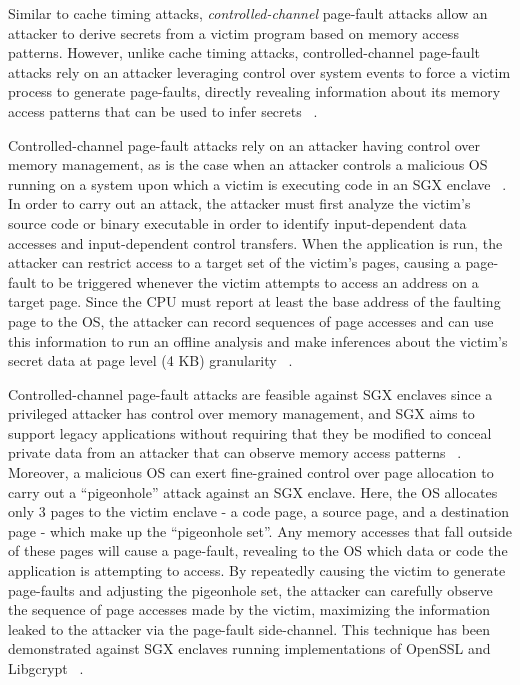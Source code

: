 Similar to cache timing attacks, \emph{controlled-channel} page-fault attacks allow an attacker to derive secrets from a victim program based on memory access patterns. However, unlike cache timing attacks, controlled-channel page-fault attacks rely on an attacker leveraging control over system events to force a victim process to generate page-faults, directly revealing information about its memory access patterns that can be used to infer secrets ~\cite{xu_controlled-channel_2015}.

Controlled-channel page-fault attacks rely on an attacker having control over memory management, as is the case when an attacker controls a malicious OS running on a system upon which a victim is executing code in an SGX enclave ~\cite{intel_corporation_tutorial_2015}. In order to carry out an attack, the attacker must first analyze the victim's source code or binary executable in order to identify input-dependent data accesses and input-dependent control transfers. When the application is run, the attacker can restrict access to a target set of the victim's pages, causing a page-fault to be triggered whenever the victim attempts to access an address on a target page. Since the CPU must report at least the base address of the faulting page to the OS, the attacker can record sequences of page accesses and can use this information to run an offline analysis and make inferences about the victim's secret data at page level (4 KB) granularity ~\cite{xu_controlled-channel_2015, shinde_preventing_2015}.

Controlled-channel page-fault attacks are feasible against SGX enclaves since a privileged attacker has control over memory management, and SGX aims to support legacy applications without requiring that they be modified to conceal private data from an attacker that can observe memory access patterns ~\cite{xu_controlled-channel_2015}. Moreover, a malicious OS can exert fine-grained control over page allocation to carry out a ``pigeonhole'' attack against an SGX enclave. Here, the OS allocates only 3 pages to the victim enclave - a code page, a source page, and a destination page - which make up the ``pigeonhole set''. Any memory accesses that fall outside of these pages will cause a page-fault, revealing to the OS which data or code the application is attempting to access. By repeatedly causing the victim to generate page-faults and adjusting the pigeonhole set, the attacker can carefully observe the sequence of page accesses made by the victim, maximizing the information leaked to the attacker via the page-fault side-channel. This technique has been demonstrated against SGX enclaves running implementations of OpenSSL and Libgcrypt ~\cite{shinde_preventing_2015}. 

